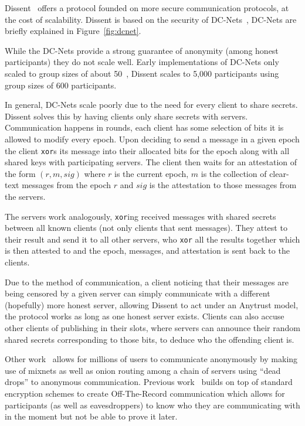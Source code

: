 \DCNet

Dissent~\cite{wolinsky2012dissent} offers a protocol founded on more secure
communication protocols, at the cost of scalability. Dissent is based on the
security of DC-Nets~\cite{chaum1988dining}, DC-Nets are briefly explained in
Figure~\ref{fig:dcnet}.

While the DC-Nets provide a strong guarantee of anonymity (among honest
participants) they do not scale well. Early implementations of DC-Nets only
scaled to group sizes of about 50~\cite{corrigan2010dissent, goel2003herbivore},
Dissent scales to 5,000 participants using group sizes of 600 participants.

In general, DC-Nets scale poorly due to the need for every client to share
secrets. Dissent solves this by having clients only share secrets with servers.
Communication happens in rounds, each client has some selection of bits it is
allowed to modify every epoch. Upon deciding to send a message in a given epoch
the client \texttt{xor}s its message into their allocated bits for the epoch
along with all shared keys with participating servers. The client then waits for
an attestation of the form $(r, m, sig)$ where $r$ is the current epoch, $m$ is
the collection of clear-text messages from the epoch $r$ and $sig$ is the
attestation to those messages from the servers.

The servers work analogously, \texttt{xor}ing received messages with shared
secrets between all known clients (not only clients that sent messages). They
attest to their result and send it to all other servers, who \texttt{xor} all
the results together which is then attested to and the epoch, messages, and
attestation is sent back to the clients.

Due to the method of communication, a client noticing that their messages are
being censored by a given server can simply communicate with a different
(hopefully) more honest server, allowing Dissent to act under an Anytrust model,
the protocol works as long as one honest server exists. Clients can also accuse
other clients of publishing in their slots, where servers can announce their
random shared secrets corresponding to those bits, to deduce who the offending
client is.

Other work~\cite{van2015vuvuzela} allows for millions of users to communicate
anonymously by making use of mixnets as well as onion routing among a chain of
servers using ``dead drops'' to anonymous communication. Previous
work~\cite{borisov2004off} builds on top of standard encryption schemes to
create Off-The-Record communication which allows for participants (as well as
eavesdroppers) to know who they are communicating with in the moment but not be
able to prove it later.
